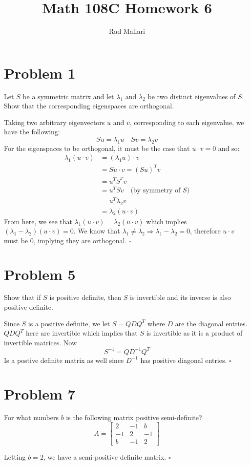\documentclass[12pt]{article}
\title{Math 108C Homework 6}
\author{Rad Mallari}
\newenvironment{proof}{\noindent{\bf Proof.}}{\hfill $\square$\medskip}
\begin{document}
\maketitle

\section{Problem 1}
Let $S$ be a symmetric matrix and let $\lambda_{1}$ and $\lambda_{2}$ be two distinct eigenvalues of $S$. Show that the corresponding eigenspaces are orthogonal.

\begin{proof}
Taking two arbitrary eigenvectors $u$ and $v$, corresponding to each eigenvalue, we have the following:
$$Su=\lambda_{1}u\quad Sv=\lambda_{2}v$$
For the eigenspaces to be orthogonal, it must be the case that $u\cdot v=0$ and
so:
\begin{equation}
    \begin{split}
        \lambda_{1}(u\cdot v)&=(\lambda_{1}u)\cdot v\\
        &=Su\cdot v=(Su)^{T}v\\
        &=u^{T}S^{T}v\\
        &=u^{T}Sv\quad\text{(by symmetry of $S$)}\\
        &=u^{T}\lambda_{2}v\\
        &=\lambda_{2}(u\cdot v) 
    \end{split}
\end{equation}
From here, we see that $\lambda_{1}(u\cdot v)=\lambda_{2}(u\cdot v)$ which implies $(\lambda_{1}-\lambda_{2})(u\cdot v)=0$. We know that $\lambda_{1}\neq\lambda_{2}\Rightarrow\lambda_{1}-\lambda_{2}=0$, therefore $u\cdot v$ must be $0$, implying they are orthogonal.
\end{proof}

\newpage
\section{Problem 5}
Show that if $S$ is positive definite, then $S$ is invertible and its inverse is also positive definite.

\begin{proof}
Since $S$ is a positive definite, we let $S=QDQ^{T}$ where $D$ are the diagonal entries. $QDQ^{T}$ here are invertible which implies that $S$ is invertible as it is a product of invertible matrices. Now 
$$S^{-1}=QD^{-1}Q^{T}$$
Is a postive definite matrix as well since $D^{-1}$ has positive diagonal entries.
\end{proof}


\section{Problem 7}
For what numbers $b$ is the following matrix positive semi-definite?
$$A=\begin{bmatrix}
    2&-1&b\\
    -1&2&-1\\
    b&-1&2
\end{bmatrix}$$

\begin{proof}
    Letting $b=2$, we have a semi-positive definite matrix.
\end{proof}
\end{document}
